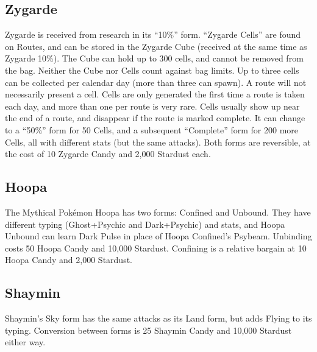 \subsection{Zygarde\label{sec:zygarde}}
Zygarde is received from research in its ``10\%'' form.
``Zygarde Cells'' are found on Routes, and can be stored in the Zygarde Cube
 (received at the same time as Zygarde 10\%).
The Cube can hold up to 300 cells, and cannot be removed from the bag.
Neither the Cube nor Cells count against bag limits.
Up to three cells can be collected per calendar day (more than three can spawn).
A route will not necessarily present a cell.
Cells are only generated the first time a route is taken each day, and more than one per route is very rare.
Cells usually show up near the end of a route, and disappear if the route is marked complete.
It can change to a ``50\%'' form for 50 Cells, and a subsequent ``Complete''
 form for 200 more Cells, all with different stats (but the same attacks).
Both forms are reversible, at the cost of 10 Zygarde Candy and 2,000 Stardust each.

\subsection{Hoopa\label{subsec:hoopa}}
The Mythical Pokémon Hoopa has two forms: Confined and Unbound.
They have different typing (Ghost+Psychic and Dark+Psychic) and stats,
  and Hoopa Unbound can learn Dark Pulse in place of Hoopa Confined's Psybeam.
Unbinding costs 50 Hoopa Candy and 10,000 Stardust.
Confining is a relative bargain at 10 Hoopa Candy and 2,000 Stardust.

\subsection{Shaymin}
Shaymin's Sky form has the same attacks as its Land form, but adds Flying to its typing.
Conversion between forms is 25 Shaymin Candy and 10,000 Stardust either way.

